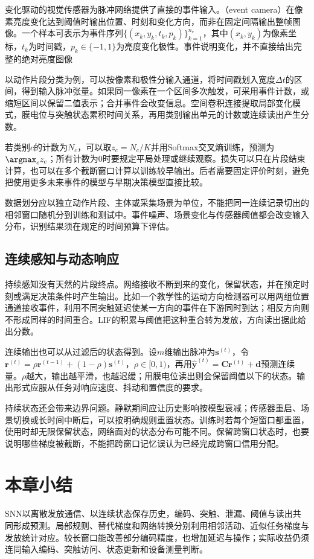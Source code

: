 变化驱动的视觉传感器为脉冲网络提供了直接的事件输入。（event camera）在像素亮度变化达到阈值时输出位置、时刻和变化方向，而非在固定间隔输出整帧图像。一个样本可表示为事件序列$\{(x_k,y_k,t_k,p_k)\}_{k=1}^{n_e}$，其中$(x_k,y_k)$为像素坐标，$t_k$为时间戳，$p_k\in\{-1,1\}$为亮度变化极性。事件说明变化，并不直接给出完整的绝对亮度图像

以动作片段分类为例，可以按像素和极性分输入通道，将时间戳划入宽度$\Delta t$的区间，得到输入脉冲张量。如果同一像素在一个区间多次触发，可采用事件计数，或缩短区间以保留二值表示；合并事件会改变信息。空间卷积连接提取局部变化模式，膜电位与突触状态累积时间关系，再用类别输出单元的计数或连续读出产生分数。

若类别$c$的计数为$N_c$，可以取$z_c=N_c/K$并用Softmax交叉熵训练，预测为$\argmax_c z_c$；所有计数为0时要规定平局处理或继续观察。损失可以只在片段结束计算，也可以在多个截断窗口计算以训练较早输出。后者需要固定评价时刻，避免把使用更多未来事件的模型与早期决策模型直接比较。

数据划分应以独立动作片段、主体或采集场景为单位，不能把同一连续记录切出的相邻窗口随机分到训练和测试中。事件噪声、场景变化与传感器阈值都会改变输入分布，识别结果须在规定的时间预算下评估。

\subsection{连续感知与动态响应}
\label{sec:snn-continuous-response}

持续感知没有天然的片段终点。网络接收不断到来的变化，保留状态，并在预定时刻或满足决策条件时产生输出。比如一个教学性的运动方向检测器可以用两组位置通道接收事件，利用不同突触延迟使某一方向的事件在下游同时到达；相反方向则不形成同样的时间重合。LIF的积累与阈值把这种重合转为发放，方向读出据此给出分数。

连续输出也可以从过滤后的状态得到。设$m$维输出脉冲为$\bm s^{(t)}$，令$\bm r^{(t)}=\rho\bm r^{(t-1)}+(1-\rho)\bm s^{(t)}$，$\rho\in[0,1)$，再用$\hat{\bm y}^{(t)}=\bm C\bm r^{(t)}+\bm d$预测连续量。$\rho$越大，输出越平滑，也越迟缓；用膜电位读出则会保留阈值以下的状态。输出形式应服从任务对响应速度、抖动和置信度的要求。

持续状态还会带来边界问题。静默期间应让历史影响按模型衰减；传感器重启、场景切换或长时间中断后，可以按明确规则重置状态。训练时若每个短窗口都重置，使用时却无限保留状态，网络面对的状态分布可能不同。保留跨窗口状态时，也要说明哪些梯度被截断，不能把跨窗口记忆误认为已经完成跨窗口信用分配。

\section{本章小结}
\label{sec:snn-summary}

SNN以离散发放通信、以连续状态保存历史，编码、突触、泄漏、阈值与读出共同形成预测。局部规则、替代梯度和网络转换分别利用相邻活动、近似任务梯度与发放统计对应。较长窗口能改善部分编码精度，也增加延迟与操作；实际收益仍须连同输入编码、突触访问、状态更新和设备测量判断。
